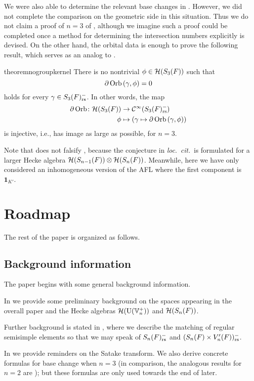 We were also able to determine the
relevant base changes in .
However, we did not complete the comparison on the geometric side in this situation.
Thus we do not claim a proof of $n = 3$ of ,
although we imagine such a proof could be completed
once a method for determining the intersection numbers explicitly is devised.
On the other hand, the orbital data is enough to prove the following result,
which serves as an analog to .
\begin{restatable}{theorem}{nogroupkernel}
  \label{thm:no_kernel_group}
  There is no nontrivial $\phi \in \mathcal H(S_3(F))$ such that
  \[ \partial \operatorname{Orb} \left( \gamma, \phi \right) = 0 \]
  holds for every $\gamma \in S_3(F)_{\mathrm{rs}}^-$.
  In other words, the map
  \begin{align*}
    \partial\operatorname{Orb} \colon \mathcal H(S_3(F)) &\to \mathcal{C}^\infty(S_3(F)_{\mathrm{rs}}^-) \\
    \phi &\mapsto \left( \gamma \mapsto \partial \operatorname{Orb} \left(\gamma, \phi \right) \right)
  \end{align*}
  is injective, i.e., has image as large as possible, for $n = 3$.
\end{restatable}
\begin{remark}
  Note that  does not falsify
  \cite[Conjecture 1.0.2]{ref:AFLspherical},
  because the conjecture in \emph{loc.\ cit.}\ is formulated
  for a larger Hecke algebra $\mathcal H(S_{n-1}(F)) \otimes \mathcal H(S_n(F))$.
  Meanwhile, here we have only considered an inhomogeneous version of the AFL
  where the first component is $\mathbf{1}_{K'}$.
\end{remark}

\section{Roadmap}
The rest of the paper is organized as follows.

\subsection{Background information}
The paper begins with some general background information.
\begin{itemize}
  \ii In  we provide some preliminary background
  on the spaces appearing in the overall paper and the Hecke algebras
  $\mathcal H(\operatorname{U}(\mathbb V_n^+))$ and $\mathcal H(S_n(F))$.

  \ii Further background is stated in ,
  where we describe the matching of regular semisimple elements
  so that we may speak of $S_n(F)_{\mathrm{rs}}^-$ and $(S_n(F) \times V'_n(F))_{\mathrm{rs}}^-$.

  \ii In  we provide reminders on the Satake transform.
  We also derive concrete formulas for base change when $n = 3$
  (in comparison, the analogous results for $n=2$ are
  \cite[Lemma 7.1.1]{ref:AFLspherical});
  but these formulas are only used towards the end of  later.
\end{itemize}

